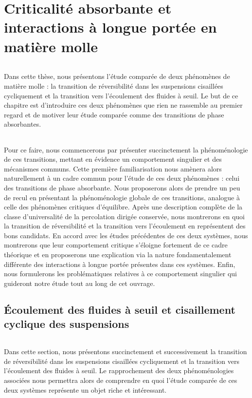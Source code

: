 \chapter{Criticalité absorbante et interactions à longue portée en matière molle}

\label{chapter:introduction}

\subparagraph{}Dans cette thèse, nous présentons l'étude comparée de deux phénomènes de matière molle : la transition de réversibilité dans les suspensions cisaillées cycliquement et la transition vers l'écoulement des fluides à seuil. Le but de ce chapitre est d'introduire ces deux phénomènes que rien ne rassemble au premier regard et de motiver leur étude comparée comme des transitions de phase absorbantes.

\subparagraph{}Pour ce faire, nous commencerons par présenter succinctement la phénoménologie de ces transitions, mettant en évidence un comportement singulier et des mécanismes communs. Cette première familiarisation nous amènera alors naturellement à un cadre commun pour l'étude de ces deux phénomènes : celui des transitions de phase absorbante. Nous proposerons alors de prendre un peu de recul en présentant la phénoménologie globale de ces transitions, analogue à celle des phénomènes critiques d'équilibre. Après une description complète de la classe d'universalité de la percolation dirigée conservée, nous montrerons en quoi la transition de réversibilité et la transition vers l'écoulement en représentent des bons candidats. En accord avec les études précédentes de ces deux systèmes, nous montrerons que leur comportement critique s'éloigne fortement de ce cadre théorique et en proposerons une explication via la nature fondamentalement différente des interactions à longue portée présentes dans ces systèmes. Enfin, nous formulerons les problématiques relatives à ce comportement singulier qui guideront notre étude tout au long de cet ouvrage.

\section{Écoulement des fluides à seuil et cisaillement cyclique des suspensions}

\subparagraph{}Dans cette section, nous présentons succinctement et successivement la transition de réversibilité dans les suspensions cisaillées cycliquement et la transition vers l'écoulement des fluides à seuil. Le rapprochement des deux phénoménologies associées nous permettra alors de comprendre en quoi l'étude comparée de ces deux systèmes représente un objet riche et intéressant.

